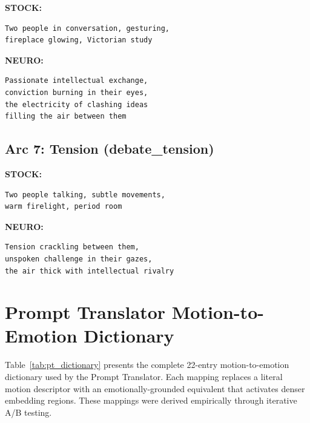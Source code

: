 \documentclass[10pt,twocolumn,letterpaper]{article}
\begin{document}
\textbf{STOCK:}
\begin{lstlisting}
Two people in conversation, gesturing,
fireplace glowing, Victorian study
\end{lstlisting}

\textbf{NEURO:}
\begin{lstlisting}
Passionate intellectual exchange,
conviction burning in their eyes,
the electricity of clashing ideas
filling the air between them
\end{lstlisting}

\subsection{Arc 7: Tension (debate\_tension)}

\textbf{STOCK:}
\begin{lstlisting}
Two people talking, subtle movements,
warm firelight, period room
\end{lstlisting}

\textbf{NEURO:}
\begin{lstlisting}
Tension crackling between them,
unspoken challenge in their gazes,
the air thick with intellectual rivalry
\end{lstlisting}

\section{Prompt Translator Motion-to-Emotion Dictionary}
\label{sec:pt_dict}

Table~\ref{tab:pt_dictionary} presents the complete 22-entry motion-to-emotion dictionary used by the Prompt Translator. Each mapping replaces a literal motion descriptor with an emotionally-grounded equivalent that activates denser embedding regions. These mappings were derived empirically through iterative A/B testing.
\end{document}
